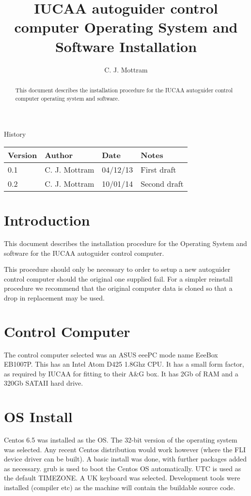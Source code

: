 \documentclass[10pt,a4paper]{article}
\title{IUCAA autoguider control computer Operating System and Software Installation}
\author{C. J. Mottram}
\date{}
\begin{document}
\thispagestyle{empty}
\maketitle
\begin{abstract}
This document describes the installation procedure for the IUCAA autoguider control computer operating system and software.
\end{abstract}
\centerline{\Large History}
\begin{center}
\begin{tabular}{|l|l|l|p{15em}|}
\hline
{\bf Version} & {\bf Author} & {\bf Date} & {\bf Notes} \\
\hline
0.1 & C. J. Mottram & 04/12/13 & First draft \\
0.2 & C. J. Mottram & 10/01/14 & Second draft \\
\hline
\end{tabular}
\end{center}

\newpage
\tableofcontents
\listoffigures
\listoftables
\newpage

\newcommand{\mytilde}{\raise.17ex\hbox{$\scriptstyle\mathtt{\sim}$}}

\section{Introduction}
This document describes the installation procedure for the Operating System and software for the IUCAA autoguider control computer.

This procedure should only be necessary to order to setup a new autoguider control computer should the original one supplied fail. For a simpler reinstall procedure we recommend that the original computer data is cloned so that a drop in replacement may be used.

\section{Control Computer}

The control computer selected was an ASUS eeePC mode name EeeBox EB1007P. This has an Intel Atom D425 1.8Ghz CPU. It has a small form factor, as required by IUCAA for fitting to their A\&G box. It has 2Gb of RAM and a 320Gb SATAII hard drive.

\section{OS Install}
Centos 6.5 was installed as the OS. The 32-bit version of the operating system was selected. Any recent Centos distribution would work however (where the FLI device driver can be built). A basic install was done, with further packages added as necessary. grub is used to boot the Centos OS automatically. UTC is used as the default TIMEZONE. A UK keyboard was selected. Development tools were installed (compiler etc) as the machine will contain the buildable source code.
\end{document}
